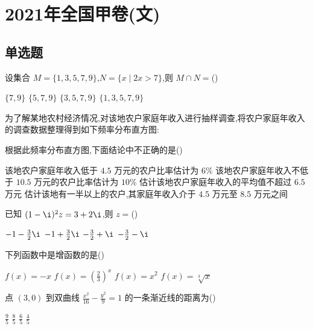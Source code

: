 \chapter{2021年全国甲卷(文)}

\section{单选题}

\begin{problem}
设集合 \(M=\{1,3,5,7,9\}\),\(N=\{x\mid 2x>7\}\),则 \(M\cap N=\)(\quad)

\choices
    {\(\{7,9\}\)}
    {\(\{5,7,9\}\)}
    {\(\{3,5,7,9\}\)}
    {\(\{1,3,5,7,9\}\)}

\end{problem}

\begin{problem}
为了解某地农村经济情况,对该地农户家庭年收入进行抽样调查,将农户家庭年收入的调查数据整理得到如下频率分布直方图:


根据此频率分布直方图,下面结论中不正确的是(\quad)

\choices
    {该地农户家庭年收入低于 \(4.5\) 万元的农户比率估计为 \(6\%\)}
    {该地农户家庭年收入不低于 \(10.5\) 万元的农户比率估计为 \(10\%\)}
    {估计该地农户家庭年收入的平均值不超过 \(6.5\) 万元}
    {估计该地有一半以上的农户,其家庭年收入介于 \(4.5\) 万元至 \(8.5\) 万元之间}

\end{problem}

\begin{problem}
已知 \((1-\i)^2z=3+2\i\),则 \(z=\)(\quad)

\choices
    {\(-1-\frac{3}{2}\i\)}
    {\(-1+\frac{3}{2}\i\)}
    {\(-\frac{3}{2}+\i\)}
    {\(-\frac{3}{2}-\i\)}

\end{problem}

\begin{problem}
下列函数中是增函数的是(\quad)

\choices
    {\(f(x)=-x\)}
    {\(f(x)=\left(\frac{2}{3}\right)^x\)}
    {\(f(x)=x^2\)}
    {\(f(x)=\sqrt[3]{x}\)}

\end{problem}

\begin{problem}
点 \((3,0)\) 到双曲线 \(\frac{x^2}{16}-\frac{y^2}{9}=1\) 的一条渐近线的距离为(\quad)

\choices
    {\(\frac{9}{5}\)}
    {\(\frac{8}{5}\)}
    {\(\frac{6}{5}\)}
    {\(\frac{4}{5}\)}

\end{problem}

